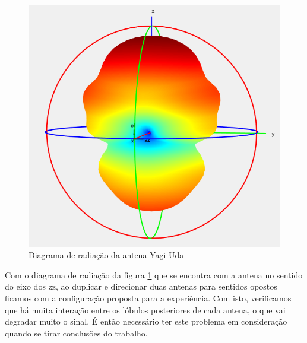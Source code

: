 \begin{figure}[h]
\centering
\includegraphics[scale=0.6]{chapters/ch3/assets/yagi}
\caption[Diagrama de radiação antena Yagi-Uda]{Diagrama de radiação da antena Yagi-Uda}
\label{fig:yagi}
\end{figure}

Com o diagrama de radiação da figura \ref{fig:yagi} que se encontra com a antena no sentido do eixo dos zz, ao duplicar e direcionar duas antenas para sentidos opostos ficamos com a configuração proposta para a experiência. Com isto, verificamos que há muita interação entre os lóbulos posteriores de cada antena, o que vai degradar muito o sinal. É então necessário ter este problema em consideração quando se tirar conclusões do trabalho.
